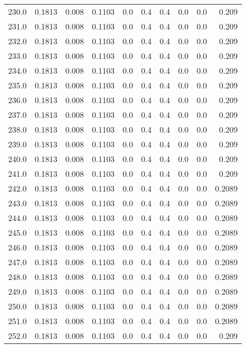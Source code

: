 \begin{longtable}{lrrrrrrrrr}
230.0 & 0.1813 & 0.008 & 0.1103 & 0.0 & 0.4 & 0.4 & 0.0 & 0.0 & 0.209 \\
231.0 & 0.1813 & 0.008 & 0.1103 & 0.0 & 0.4 & 0.4 & 0.0 & 0.0 & 0.209 \\
232.0 & 0.1813 & 0.008 & 0.1103 & 0.0 & 0.4 & 0.4 & 0.0 & 0.0 & 0.209 \\
233.0 & 0.1813 & 0.008 & 0.1103 & 0.0 & 0.4 & 0.4 & 0.0 & 0.0 & 0.209 \\
234.0 & 0.1813 & 0.008 & 0.1103 & 0.0 & 0.4 & 0.4 & 0.0 & 0.0 & 0.209 \\
235.0 & 0.1813 & 0.008 & 0.1103 & 0.0 & 0.4 & 0.4 & 0.0 & 0.0 & 0.209 \\
236.0 & 0.1813 & 0.008 & 0.1103 & 0.0 & 0.4 & 0.4 & 0.0 & 0.0 & 0.209 \\
237.0 & 0.1813 & 0.008 & 0.1103 & 0.0 & 0.4 & 0.4 & 0.0 & 0.0 & 0.209 \\
238.0 & 0.1813 & 0.008 & 0.1103 & 0.0 & 0.4 & 0.4 & 0.0 & 0.0 & 0.209 \\
239.0 & 0.1813 & 0.008 & 0.1103 & 0.0 & 0.4 & 0.4 & 0.0 & 0.0 & 0.209 \\
240.0 & 0.1813 & 0.008 & 0.1103 & 0.0 & 0.4 & 0.4 & 0.0 & 0.0 & 0.209 \\
241.0 & 0.1813 & 0.008 & 0.1103 & 0.0 & 0.4 & 0.4 & 0.0 & 0.0 & 0.209 \\
242.0 & 0.1813 & 0.008 & 0.1103 & 0.0 & 0.4 & 0.4 & 0.0 & 0.0 & 0.2089 \\
243.0 & 0.1813 & 0.008 & 0.1103 & 0.0 & 0.4 & 0.4 & 0.0 & 0.0 & 0.2089 \\
244.0 & 0.1813 & 0.008 & 0.1103 & 0.0 & 0.4 & 0.4 & 0.0 & 0.0 & 0.2089 \\
245.0 & 0.1813 & 0.008 & 0.1103 & 0.0 & 0.4 & 0.4 & 0.0 & 0.0 & 0.2089 \\
246.0 & 0.1813 & 0.008 & 0.1103 & 0.0 & 0.4 & 0.4 & 0.0 & 0.0 & 0.2089 \\
247.0 & 0.1813 & 0.008 & 0.1103 & 0.0 & 0.4 & 0.4 & 0.0 & 0.0 & 0.2089 \\
248.0 & 0.1813 & 0.008 & 0.1103 & 0.0 & 0.4 & 0.4 & 0.0 & 0.0 & 0.2089 \\
249.0 & 0.1813 & 0.008 & 0.1103 & 0.0 & 0.4 & 0.4 & 0.0 & 0.0 & 0.2089 \\
250.0 & 0.1813 & 0.008 & 0.1103 & 0.0 & 0.4 & 0.4 & 0.0 & 0.0 & 0.2089 \\
251.0 & 0.1813 & 0.008 & 0.1103 & 0.0 & 0.4 & 0.4 & 0.0 & 0.0 & 0.2089 \\
252.0 & 0.1813 & 0.008 & 0.1103 & 0.0 & 0.4 & 0.4 & 0.0 & 0.0 & 0.209 \\

\end{longtable}
